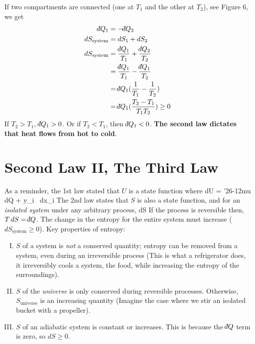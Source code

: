 \documentclass[12pt]{article}
\def\dbar{{\mathchar'26\mkern-12mu d}}
\begin{document}
If two compartments are connected (one at $T_1$ and the other at $T_2$), see Figure 6, we get
\begin{align*}
\dbar Q_1 &= -\dbar Q_2\\
dS_\text{system} &= dS_1 + dS_2\\
dS_\text{system} &= \frac{\dbar Q_1}{T_1} + \frac{\dbar Q_2}{T_2}\\
&= \frac{\dbar Q_1}{T_1} - \frac{\dbar Q_1}{T_2}\\
&= \dbar Q_1 (\frac{1}{T_1} - \frac{1}{T_2})\\
&= \dbar Q_1 (\frac{T_2 - T_1}{T_1 T_2}) \geq 0\\
\end{align*}
If $T_2 > T_1$, $\dbar Q_1 > 0$.  Or if $T_2 < T_1$, then $\dbar Q_1 < 0$.  \textbf{The second law dictates that heat flows from hot to cold}.

\section{Second Law II, The Third Law}
As a reminder, the 1st law stated that $U$ is a state function where
\beq
dU = \dbar Q + \sum y_i \, dx_i
\ceq
The 2nd law states that $S$ is also a state function, and for an \emph{isolated system} under any arbitrary process,
\beq dS \geq \frac{\dbar Q}{T} \ceq
If the process is reversible then, $T\, dS = \dbar Q$.  The change in the entropy for the entire system must increase ($dS_\text{system} \geq 0$).
Key properties of entropy:
\begin{enumerate}[(I)]
\item $S$ of a system is \emph{not} a conserved quantity; entropy can be removed from a system, even during an irreversible process (This is what a refrigerator does, it irreversibly cools a system, the food, while increasing the entropy of the surroundings). 
\item $S$ of the \emph{universe} is only conserved during reversible processes. Otherwise, $S_\text{universe}$ is an increasing quantity (Imagine the case where we stir an isolated bucket with a propeller).
\item $S$ of an adiabatic system is constant or increases.  This is because the $\dbar Q$ term is zero, so $dS \geq 0$. %
\end{enumerate}
\end{document}
